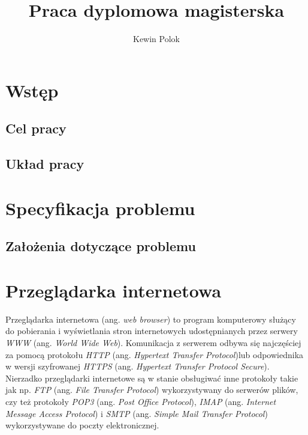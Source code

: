 \documentclass[polish, twoside, 12pt]{mwart}
\author{Kewin Polok}
\title{Praca dyplomowa magisterska}
\let\stdsection\section
\renewcommand*{\section}{\clearpage\stdsection}
\begin{document}
\maketitle
 
\newpage

\tableofcontents

\newpage

\listoffigures
 
\listoftables

\newpage

\section{Wstęp}

\subsection{Cel pracy}

\subsection{Układ pracy}

\section{Specyfikacja problemu}

\subsection{Założenia dotyczące problemu}

\section{Przeglądarka internetowa}

Przeglądarka internetowa (ang. \emph{web browser}) to program komputerowy służący do pobierania i wyświetlania stron internetowych udostępnianych przez serwery \emph{WWW} (ang. \emph{World Wide Web}). Komunikacja z serwerem odbywa się najczęściej za pomocą protokołu \emph{HTTP} (ang. \emph{Hypertext Transfer Protocol})lub odpowiednika w wersji szyfrowanej \emph{HTTPS} (ang. \emph{Hypertext Transfer Protocol Secure}). Nierzadko przeglądarki internetowe są w stanie obsługiwać inne protokoły takie jak np. \emph{FTP} (ang. \emph{File Transfer Protocol}) wykorzystywany do serwerów plików, czy też protokoły \emph{POP3} (ang. \emph{Post Office Protocol}), \emph{IMAP} (ang. \emph{Internet Message Access Protocol}) i \emph{SMTP} (ang. \emph{Simple Mail Transfer Protocol}) wykorzystywane do poczty elektronicznej. 
\end{document}
